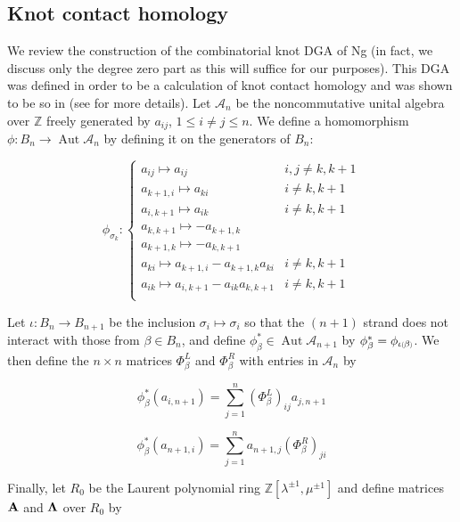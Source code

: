 \documentclass[11pt]{amsart}
\def\Z{{\mathbb Z}}
\def\A{{\mathcal A}}
\def\s{{\sigma}}
\newcommand*{\subsmallp}[1]{\scalebox{.5}{\ensuremath#1}}
\newcommand\Aut{\operatorname{Aut}}
\theoremstyle{definition}
\begin{document}
\subsection{Knot contact homology}
\label{SecBG_KCHdef}

  We review the construction of the combinatorial knot DGA of Ng (in fact, we discuss only the degree zero part as this will suffice for our purposes). This DGA was defined in order to be a calculation of knot contact homology and was shown to be so in \cite{EENS12} (see \cite{Ng12} for more details). Let $\A_n$ be the noncommutative unital algebra over $\Z$ freely generated by $a_{ij}$, $1\le i\ne j\le n$. We define a homomorphism $\phi : B_n \rightarrow\Aut \A_n$ by defining it on the generators of $B_n$:

  \begin{equation}
  \phi_{\s_k}\colon
  \left\{
       \begin{array}{lr}
         a_{ij}\mapsto a_{ij} & i,j\ne k,k+1\\
         a_{k+1,i}\mapsto a_{ki} & i\ne k,k+1\\
         a_{i,k+1}\mapsto a_{ik} & i\ne k,k+1\\
         a_{k,k+1}\mapsto -a_{k+1,k} & \\
         a_{k+1,k}\mapsto -a_{k,k+1} & \\
         a_{ki}\mapsto a_{k+1,i} - a_{k+1,k}a_{ki} & i\ne k,k+1\\
         a_{ik}\mapsto a_{i,k+1} - a_{ik}a_{k,k+1} & i\ne k,k+1\\
       \end{array}
  \right.
  \label{DefnPhiMap}
  \end{equation}

  Let $\iota\colon B_n \rightarrow B_{n+1}$ be the inclusion $\s_i\mapsto\s_i$ so that the $(n+1)$ strand does not interact with those from $\beta\in B_n$, and define $\phi_\beta^*\in \Aut \A_{n+1}$ by $\phi_\beta^* = \phi_{\iota\subsmallp(\beta\subsmallp)}$. We then define the $n\times n$ matrices $\Phi_\beta^L$ and $\Phi_\beta^R$ with entries in $\A_n$ by

  $$\phi_\beta^*(a_{i,n+1}) = \sum_{j=1}^n(\Phi_\beta^L)_{ij}a_{j,n+1}$$

  $$\phi_\beta^*(a_{n+1,i}) = \sum_{j=1}^na_{n+1,j}(\Phi_\beta^R)_{ji}$$

  Finally, let $R_0$ be the Laurent polynomial ring $\Z[\lambda^{\pm1},\mu^{\pm1}]$ and define matrices $\bf{A}$ and $\bf{\Lambda}$ over $R_0$ by
\end{document}
